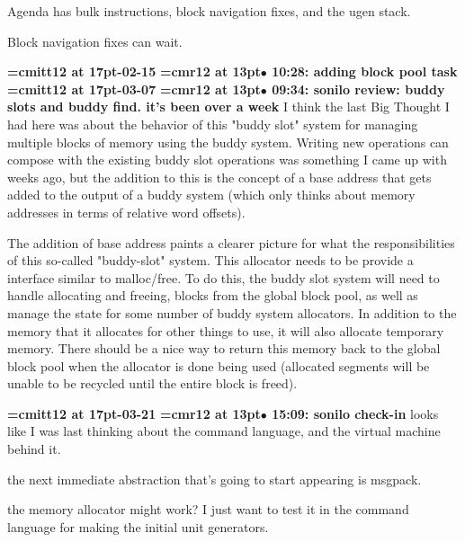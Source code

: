 Agenda has bulk instructions, block navigation fixes, and the ugen stack.
\par

Block navigation fixes can wait.
\par

{\medskip\noindent\bf\font\titlefont=cmitt12 at 17pt-02-15}\medskip
{\smallskip\noindent\bf\font\titlefont=cmr12 at 13pt\titlefont $\bullet$ 10:28: adding block pool task}\smallskip
{\medskip\noindent\bf\font\titlefont=cmitt12 at 17pt-03-07}\medskip
{\smallskip\noindent\bf\font\titlefont=cmr12 at 13pt\titlefont $\bullet$ 09:34: sonilo review: buddy slots and buddy find. it's been over a week}\smallskip
I think the last Big Thought I had here was about the behavior of this "buddy slot" system for managing multiple blocks of memory using the buddy system. Writing new operations can compose with the existing buddy slot operations was something I came up with weeks ago, but the addition to this is the concept of a base address that gets added to the output of a buddy system (which only thinks about memory addresses in terms of relative word offsets).
\par

The addition of base address paints a clearer picture for what the responsibilities of this so-called "buddy-slot" system. This allocator needs to be provide a interface similar to malloc/free. To do this, the buddy slot system will need to handle allocating and freeing, blocks from the global block pool, as well as manage the state for some number of buddy system allocators. In addition to the memory that it allocates for other things to use, it will also allocate temporary memory. There should be a nice way to return this memory back to the global block pool when the allocator is done being used (allocated segments will be unable to be recycled until the entire block is freed).
\par

{\medskip\noindent\bf\font\titlefont=cmitt12 at 17pt-03-21}\medskip
{\smallskip\noindent\bf\font\titlefont=cmr12 at 13pt\titlefont $\bullet$ 15:09: sonilo check-in}\smallskip
looks like I was last thinking about the command language, and the virtual machine behind it.
\par

the next immediate abstraction that's going to start appearing is msgpack.
\par

the memory allocator might work? I just want to test it in the command language for making the initial unit generators.
\par


